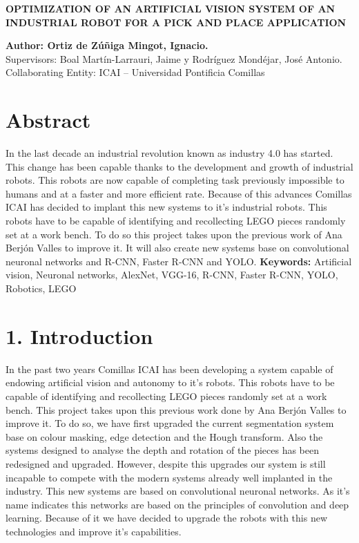 {\setlength{\parindent}{0pt}
\begin{Large}
\textbf{OPTIMIZATION OF AN ARTIFICIAL VISION SYSTEM OF AN INDUSTRIAL ROBOT FOR A PICK AND PLACE APPLICATION}
\end{Large}

\textbf{Author: Ortiz de Zúñiga Mingot, Ignacio.} \\
Supervisors: Boal Martín-Larrauri, Jaime y Rodríguez Mondéjar, José Antonio. \\
Collaborating Entity: ICAI – Universidad Pontificia Comillas \\

\section*{Abstract}
In the last decade an industrial revolution known as industry 4.0 has started. This change has been capable thanks to the development and growth of industrial robots. This robots are now capable of completing task previously impossible to humans and at a faster and more efficient rate. Because of this advances Comillas ICAI has decided to implant this new systems to it's industrial robots. This robots have to be capable of identifying and recollecting LEGO pieces randomly set at a work bench. To do so this project takes upon the previous work of Ana Berjón Valles to improve it. It will also create new systems base on convolutional neuronal networks and R-CNN, Faster R-CNN and YOLO.
\textbf{Keywords:} Artificial vision, Neuronal networks, AlexNet, VGG-16, R-CNN, Faster R-CNN, YOLO, Robotics, LEGO

\section*{1. Introduction}
In the past two years Comillas ICAI has been developing a system capable of endowing artificial vision and autonomy to it's robots. This robots have to be capable of identifying and recollecting LEGO pieces randomly set at a work bench. This project takes upon this previous work done by Ana Berjón Valles to improve it. To do so, we have first upgraded the current segmentation system base on colour masking, edge detection and the Hough transform. Also the systems designed to analyse the depth and rotation of the pieces has been redesigned and upgraded. However, despite this upgrades our system is still incapable to compete with the modern systems already well implanted in the industry. This new systems are based on convolutional neuronal networks. As it's name indicates this networks are based on the principles of convolution and deep learning. Because of it we have decided to upgrade the robots with this new technologies and improve it's capabilities.

}

